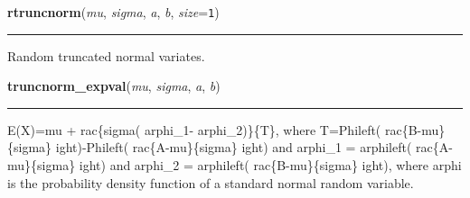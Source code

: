     \vspace{0.5ex}

    \begin{boxedminipage}{\textwidth}

    \raggedright \textbf{rtruncnorm}(\textit{mu}, \textit{sigma}, \textit{a}, \textit{b}, \textit{size}=\texttt{1})

    \vspace{-1.5ex}

    \rule{\textwidth}{0.5\fboxrule}

Random truncated normal variates.
    \vspace{1ex}

    \end{boxedminipage}

    \label{pymc:distributions:truncnorm_expval}

    \vspace{0.5ex}

    \begin{boxedminipage}{\textwidth}

    \raggedright \textbf{truncnorm\_expval}(\textit{mu}, \textit{sigma}, \textit{a}, \textit{b})

    \vspace{-1.5ex}

    \rule{\textwidth}{0.5\fboxrule}

E(X)=mu +  rac{\{}sigma( arphi{\_}1- arphi{\_}2){\}}{\{}T{\}}, where T=Phileft( rac{\{}B-mu{\}}{\{}sigma{\}}
ight)-Phileft( rac{\{}A-mu{\}}{\{}sigma{\}}
ight) and  arphi{\_}1 =  arphileft( rac{\{}A-mu{\}}{\{}sigma{\}}
ight) and  arphi{\_}2 =  arphileft( rac{\{}B-mu{\}}{\{}sigma{\}}
ight), where  arphi is the probability density function of a standard normal random variable.
    \vspace{1ex}

    \end{boxedminipage}

    \label{pymc:distributions:truncnorm_like}

    \vspace{0.5ex}

